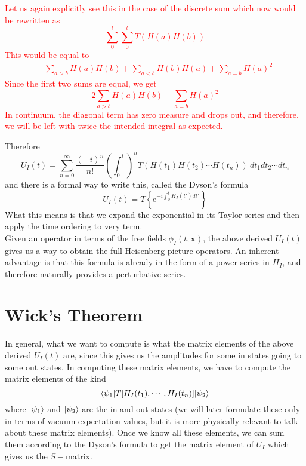 \documentclass[11pt]{article}
\newcommand{\e}{\mathrm{e}}
\numberwithin{equation}{section}
\begin{document}
    \textcolor{red}{
        Let us again explicitly see this in the case of the discrete sum 
        which now would be rewritten as 
        \begin{equation*}
            \sum_0^t \sum_0^t T(H(a) H(b))
        \end{equation*}
        This would be equal to 
        \begin{align*}
            &\sum_{a>b} H(a)H(b) + \sum_{a<b}H(b)H(a) + \sum_{a=b}H(a)^2
        \end{align*}
        Since the first two sums are equal, we get 
        \begin{equation*}
            2\sum_{a>b} H(a)H(b) + \sum_{a=b}H(a)^2
        \end{equation*}
        In continuum, the diagonal term has zero measure and drops out, and therefore, we will be left with twice the intended integral as expected.\\
    }

    Therefore 
    \begin{equation*}
        U_I(t) = \sum_{n=0}^\infty \frac{(-i)^n}{n!} \left(\int_0^t\right)^n T(H(t_1) H(t_2) \cdots H(t_n)) ~dt_1 dt_2 \cdots dt_n 
    \end{equation*}
    and there is a formal way to write this, called the Dyson's formula
    \begin{equation*}
        U_I(t) = T\left\{ \e^{-i\int_0^t H_I(t')dt'}  \right\}
    \end{equation*}
    What this means is that we expand the exponential in its Taylor series and then apply the time ordering to very term.\\

    Given an operator in terms of the free fields \(\phi_I(t,\textbf{x})\), the above derived \(U_I(t)\) gives us a way to obtain the full Heisenberg picture operators. An inherent advantage is that this formula is already in the form of a power series in \(H_I\), and therefore naturally provides a perturbative series.

    \newpage
    \section{Wick's Theorem}
    In general, what we want to compute is what the matrix elements of the above derived \(U_I(t)\) are, since this gives us the amplitudes for some in states going to some out states. In computing these matrix elements, we have to compute the matrix elements of the kind 
    \begin{equation*}
        \braket{\psi_1 | T[H_I(t_1),\cdots,H_I(t_n)]|\psi_2}
    \end{equation*}
    where \(\ket{\psi_1}\) and \(\ket{\psi_2}\) are the in and out states (we will later formulate these only in terms of vacuum expectation values, but it is more physically relevant to talk about these matrix elements). Once we know all these elements, we can sum them according to the Dyson's formula to get the matrix element of \(U_I\) which gives us the \(S-\)matrix. \\
\end{document}
